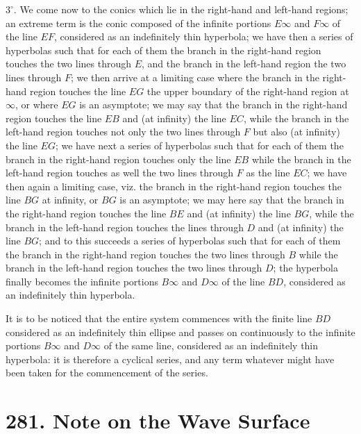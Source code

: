 \documentclass[11pt,a4paper]{book}
\begin{document}
$3^\circ$. We come now to the conics which lie in the right-hand and left-hand regions; an extreme term is the conic composed of the infinite portions $E\infty$ and $F\infty$ of the line $EF$, considered as an indefinitely thin hyperbola; we have then a series of hyperbolas such that for each of them the branch in the right-hand region touches the two lines through $E$, and the branch in the left-hand region the two lines through $F$; we then arrive at a limiting case where the branch in the right-hand region touches the line $EG$ the upper boundary of the right-hand region at $\infty$, or where $EG$ is an asymptote; we may say that the branch in the right-hand region touches the line $EB$ and (at infinity) the line $EC$, while the branch in the left-hand region touches not only the two lines through $F$ but also (at infinity) the line $EG$; we have next a series of hyperbolas such that for each of them the branch in the right-hand region touches only the line $EB$ while the branch in the left-hand region touches as well the two lines through $F$ as the line $EC$; we have then again a limiting case, viz. the branch in the right-hand region touches the line $BG$ at infinity, or $BG$ is an asymptote; we may here say that the branch in the right-hand region touches the line $BE$ and (at infinity) the line $BG$, while the branch in the left-hand region touches the lines through $D$ and (at infinity) the line $BG$; and to this succeeds a series of hyperbolas such that for each of them the branch in the right-hand region touches the two lines through $B$ while the branch in the left-hand region touches the two lines through $D$; the hyperbola finally becomes the infinite portions $B\infty$ and $D\infty$ of the line $BD$, considered as an indefinitely thin hyperbola.

It is to be noticed that the entire system commences with the finite line $BD$ considered as an indefinitely thin ellipse and passes on continuously to the infinite portions $B\infty$ and $D\infty$ of the same line, considered as an indefinitely thin hyperbola: it is therefore a cyclical series, and any term whatever might have been taken for the commencement of the series.


\newpage
\section*{281. Note on the Wave Surface}
\label{sec:281}
\end{document}
